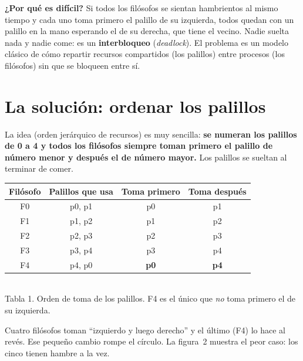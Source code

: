 \documentclass[12pt,letterpaper]{article}
\begin{document}
\textbf{¿Por qué es difícil?} Si todos los filósofos se sientan hambrientos al mismo tiempo y cada uno toma primero el palillo de su izquierda, todos quedan con un palillo en la mano esperando el de su derecha, que tiene el vecino. Nadie suelta nada y nadie come: es un \textbf{interbloqueo} (\emph{deadlock}). El problema es un modelo clásico de cómo repartir recursos compartidos (los palillos) entre procesos (los filósofos) sin que se bloqueen entre sí.

\section{La solución: ordenar los palillos}
La idea (orden jerárquico de recursos) es muy sencilla: \textbf{se numeran los palillos de 0 a 4 y todos los filósofos siempre toman primero el palillo de número menor y después el de número mayor.} Los palillos se sueltan al terminar de comer.

\begin{center}
\small
\begin{tabular}{|c|c|c|c|}
\hline
\textbf{Filósofo} & \textbf{Palillos que usa} & \textbf{Toma primero} & \textbf{Toma después}\\
\hline
F0 & p0, p1 & p0 & p1\\ \hline
F1 & p1, p2 & p1 & p2\\ \hline
F2 & p2, p3 & p2 & p3\\ \hline
F3 & p3, p4 & p3 & p4\\ \hline
F4 & p4, p0 & \textbf{p0} & \textbf{p4}\\ \hline
\end{tabular}\\[3pt]
{\footnotesize Tabla 1. Orden de toma de los palillos. F4 es el único que \emph{no} toma primero el de su izquierda.}
\end{center}

Cuatro filósofos toman ``izquierdo y luego derecho'' y el último (F4) lo hace al revés. Ese pequeño cambio rompe el círculo. La figura~2 muestra el peor caso: los cinco tienen hambre a la vez.
\end{document}
